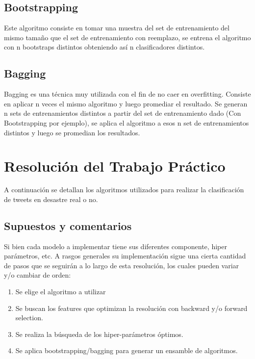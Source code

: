 \documentclass[12pt]{article}
\begin{document}
\subsection{Bootstrapping}
Este algoritmo consiste en tomar una muestra del set de entrenamiento del mismo tamaño que el set de entrenamiento con reemplazo, se entrena el algoritmo con n bootstraps distintos obteniendo así n clasificadores distintos.


\subsection{Bagging}
Bagging es una técnica muy utilizada con el fin de no caer en overfitting.
Consiste en aplicar n veces el mismo algoritmo y luego promediar el resultado.
Se generan n sets de entrenamientos distintos a partir del set de entrenamiento dado (Con Bootstrapping por ejemplo), se aplica el algoritmo a esos n set de entrenamientos distintos y luego se promedian los resultados.



\newpage
\section{Resolución del Trabajo Práctico}

A continuación se detallan los algoritmos utilizados para realizar la clasificación de tweets en desastre real o no.


\subsection{Supuestos y comentarios}

Si bien cada modelo a implementar tiene sus diferentes componente, hiper parámetros, etc. A rasgos generales su implementación sigue una cierta cantidad de pasos que se seguirán a lo largo de esta resolución, los cuales pueden variar y/o cambiar de orden:

\begin{enumerate}
  \item Se elige el algoritmo a utilizar
  \item Se buscan los features que optimizan la resolución con backward y/o forward selection.
  \item Se realiza la búsqueda de los hiper-parámetros óptimos.
  \item Se aplica bootstrapping/bagging para generar un ensamble de algoritmos.
\end{enumerate}
\end{document}
